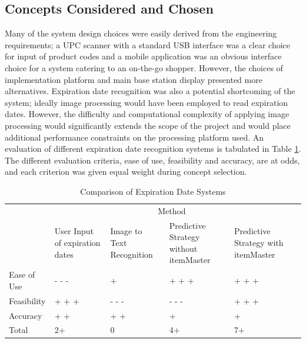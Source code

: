 \documentclass[11pt]{article} %
\begin{document}
\subsection{Concepts Considered and Chosen}
Many of the system design choices were easily derived from the engineering requirements; a UPC scanner with a standard USB interface was a clear choice for input of product codes and a mobile application was an obvious interface choice for a system catering to an on-the-go shopper. However, the choices of implementation platform and main base station display presented more alternatives. Expiration date recognition was also a potential shortcoming of the system; ideally image processing would have been employed to read expiration dates. However, the difficulty and computational complexity of applying image processing would significantly extends the scope of the project and would place additional performance constraints on the processing platform used. An evaluation of different expiration date recognition systems is tabulated in Table \ref{tab:datesys}. The different evaluation criteria, ease of use, feasibility and accuracy, are at odds, and each criterion was given equal weight during concept selection.
\begin{table}[h!]
\vspace{0.5cm}
\caption{Comparison of Expiration Date Systems}
\begin{tabular}{| p{1in} | p{1.15in} | p{1.15in} | p{1.15in} | p{1.15in}  | p{1.15in} |}
\cline{2-5}
\multicolumn{1}{c}{}&\multicolumn{4}{|c|}{Method} \\
\cline{2-5}
\multicolumn{1}{c|}{}&User Input \newline of expiration \newline dates& Image to Text \newline Recognition & Predictive \newline Strategy without \newline itemMaster& Predictive \newline Strategy with \newline itemMaster \\
\hline
Ease of Use&- - -&+&+ + +&+ + +\\
\hline
Feasibility&+ + +&- - -&- - -&+ + +\\
\hline
Accuracy & + + & + + &+&+\\
\hline \hline
Total &2+ &0&4+&7+\\
\hline
\end{tabular}
\label{tab:datesys}
\end{table}
\end{document}
